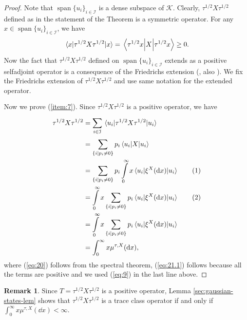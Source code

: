 \documentclass[12pt,a4paper,oneside]{article}
\numberwithin{equation}{section}
\theoremstyle{definition}  %
\newtheorem{rmk}[defn]{Remark}
\theoremstyle{plain}  %
\theoremstyle{remark} %
\newcommand{\CK}{\mathcal{K}}
\newcommand{\numberthis}{\refstepcounter{equation}\tag{\theequation}}
\let\tr\relax
\DeclareMathOperator{\tr}{Tr}
\DeclareMathOperator{\spn}{span}
\begin{document}
\begin{proof}
Note that $\spn\{u_i\}_{i\in \mathcal{I}}$ is a dense subspace of $\CK$. Clearly, $\tau^{1/2}X\tau^{1/2}$ defined as in the statement of the Theorem is a symmetric operator. For any $x\in \spn\{u_i\}_{i\in \mathcal{I}}$, we have \[\mel{x}{\tau^{1/2}X\tau^{1/2}}{x} = \mel{\tau^{1/2}x}{X}{\tau^{1/2}x} \geq 0.\]
Now the fact that  $\tau^{1/2}X\tau^{1/2}$ defined on $\spn\{u_i\}_{i\in \mathcal{I}}$ extends as a positive selfadjoint operator is a consequence of the Friedrichs extension (\cite[Theorem 5.1.13]{pedersen2012analysis}, also \cite[Theorem X.23]{ReS75ii}). We fix the Friedrichs extension  of $\tau^{1/2}X\tau^{1/2}$ and use same notation for the extended operator.  

Now we prove (\ref{item:7}). Since $\tau^{1/2}X\tau^{1/2}$ is a positive operator, we have
\begin{align*} \tr \tau^{1/2}X\tau^{1/2}&=
\sum\limits_{i\in \mathcal{I}}^{}\mel{u_i}{\tau^{1/2}X\tau^{1/2}}{u_i}\\ &=
                                                        \sum\limits_{\{i|p_i\neq 0\}}^{}p_i\mel{u_i}{X}{u_i}\\
  & =\sum\limits_{\{i|p_i\neq 0\}}^{}p_i \int\limits_{0}^{\infty}x\mel{u_i}{\xi^X(\dd
    x)}{u_i}\numberthis \label{eq:20}\\
  & = \int\limits_{0}^{\infty}x \sum\limits_{\{i|p_i\neq 0\}}^{}p_i\mel{u_i}{\xi^X(\dd
    x)}{u_i}\numberthis \label{eq:21.1}\\
& = \int\limits_{0}^{\infty}x \sum\limits_{\{i|p_i\neq 0\}}^{}p_i\mel{u_i}{\xi^X(\dd
    x)}{u_i}\\    
  &=\int_{0}^{\infty}x \mu^{\tau,X}(\dd x),
\end{align*} where (\ref{eq:20}) follows from the spectral theorem, (\ref{eq:21.1}) follows because all the terms are positive and we used (\ref{eq:9}) in the last line above. 
\end{proof}
\begin{rmk}
Since
$T=\tau^{1/2}X\tau^{1/2}$ is a positive operator, Lemma
\ref{sec:gaussian-states-lem} shows that $\tau^{1/2}X\tau^{1/2}$ is a
trace class operator if and only if $\int_{0}^{\infty}x \mu^{\tau,X}(\dd x)<\infty$.
\end{rmk}
\end{document}
